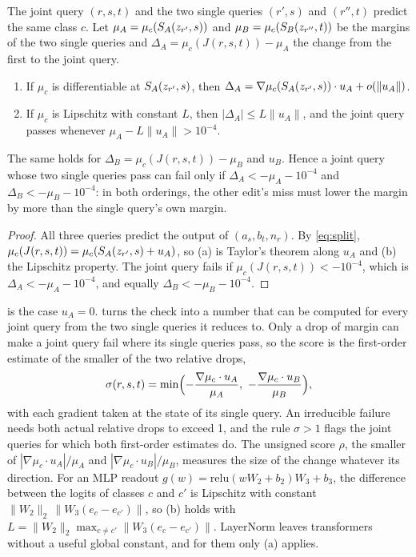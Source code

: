 \begin{proposition}\label{prop:margin}
The joint query $(r,s,t)$ and the two single queries $(r',s)$ and $(r'',t)$ predict the same class $c$. Let
$\mu_A=\mu_c(S_A(z_{r'},s))$ and $\mu_B=\mu_c(S_B(z_{r''},t))$ be the margins of the two single queries and
$\Delta_A=\mu_c(J(r,s,t))-\mu_A$ the change from the first to the joint query.
\begin{enumerate}[label=(\alph*)]
  \item If $\mu_c$ is differentiable at $S_A(z_{r'},s)$, then $\Delta_A=\nabla\mu_c(S_A(z_{r'},s))\cdot u_A+o(\|u_A\|)$.
  \item If $\mu_c$ is Lipschitz with constant $L$, then $|\Delta_A|\le L\|u_A\|$, and the joint query passes whenever
  $\mu_A-L\|u_A\|>10^{-4}$.
\end{enumerate}
The same holds for $\Delta_B=\mu_c(J(r,s,t))-\mu_B$ and $u_B$. Hence a joint query whose two single queries pass can
fail only if $\Delta_A<-\mu_A-10^{-4}$ and $\Delta_B<-\mu_B-10^{-4}$: in both orderings, the other edit's miss must
lower the margin by more than the single query's own margin.
\end{proposition}

\begin{proof}
All three queries predict the output of $(a_s,b_t,n_r)$. By \cref{eq:split}, $\mu_c(J(r,s,t))=\mu_c(S_A(z_{r'},s)+u_A)$,
so (a) is Taylor's theorem along $u_A$ and (b) the Lipschitz property. The joint query fails if
$\mu_c(J(r,s,t))<-10^{-4}$, which is $\Delta_A<-\mu_A-10^{-4}$, and equally $\Delta_B<-\mu_B-10^{-4}$.
\end{proof}

 is the case $u_A=0$.  turns the check into a number that can be computed for
every joint query from the two single queries it reduces to. Only a drop of margin can make a joint query fail where
its single queries pass, so the score is the first-order estimate of the smaller of the two relative drops,
\[
  \sigma(r,s,t)=\min\Bigl(-\frac{\nabla\mu_c\cdot u_A}{\mu_A},\ -\frac{\nabla\mu_c\cdot u_B}{\mu_B}\Bigr),
\]
with each gradient taken at the state of its single query. An irreducible failure needs both actual relative drops to
exceed 1, and the rule $\sigma>1$ flags the joint queries for which both first-order estimates do. The unsigned score
$\rho$, the smaller of $|\nabla\mu_c\cdot u_A|/\mu_A$ and $|\nabla\mu_c\cdot u_B|/\mu_B$, measures the size of the
change whatever its direction. For an MLP readout $g(w)=\mathrm{relu}(wW_2+b_2)W_3+b_3$, the difference between the
logits of classes $c$ and $c'$ is Lipschitz with constant $\|W_2\|_2\,\|W_3(e_c-e_{c'})\|$, so (b) holds with
$L=\|W_2\|_2\max_{c\ne c'}\|W_3(e_c-e_{c'})\|$. LayerNorm leaves transformers without a useful global constant, and
for them only (a) applies.

